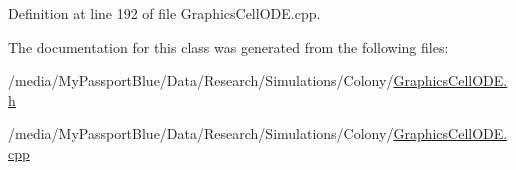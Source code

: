 \-Definition at line 192 of file \-Graphics\-Cell\-O\-D\-E.\-cpp.



\-The documentation for this class was generated from the following files\-:\begin{DoxyCompactItemize}
\item 
/media/\-My\-Passport\-Blue/\-Data/\-Research/\-Simulations/\-Colony/\hyperlink{_graphics_cell_o_d_e_8h}{\-Graphics\-Cell\-O\-D\-E.\-h}\item 
/media/\-My\-Passport\-Blue/\-Data/\-Research/\-Simulations/\-Colony/\hyperlink{_graphics_cell_o_d_e_8cpp}{\-Graphics\-Cell\-O\-D\-E.\-cpp}\end{DoxyCompactItemize}
